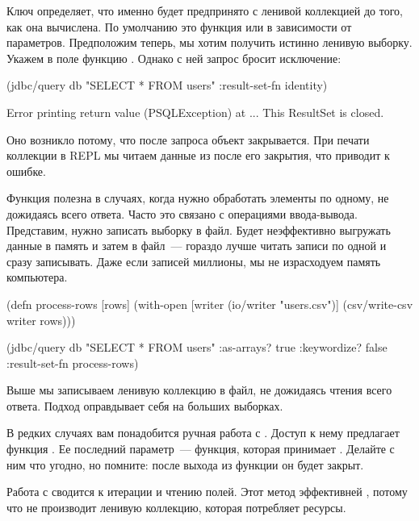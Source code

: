 Ключ  определяет, что именно будет предпринято с ленивой коллекцией до того, как она вычислена. По умолчанию это функция  или  в зависимости от параметров. Предположим теперь, мы хотим получить истинно ленивую выборку. Укажем в поле  функцию . Однако с ней запрос бросит исключение:

\begin{english}
  \begin{clojure}
(jdbc/query db "SELECT * FROM users"
               {:result-set-fn identity})

Error printing return value (PSQLException) at ...
This ResultSet is closed.
  \end{clojure}
\end{english}

Оно возникло потому, что после запроса объект  закрывается. При печати коллекции в REPL мы читаем данные из  после его закрытия, что приводит к ошибке.

Функция  полезна в случаях, когда нужно обработать элементы по одному, не дожидаясь всего ответа. Часто это связано с операциями ввода-вывода. Представим, нужно записать выборку в файл. Будет неэффективно выгружать данные в память и затем в файл~--- гораздо лучше читать записи по одной и сразу записывать. Даже если записей миллионы, мы не израсходуем память компьютера.

\begin{english}
  \begin{clojure}
(defn process-rows [rows]
  (with-open [writer (io/writer "users.csv")]
    (csv/write-csv writer rows)))

(jdbc/query db "SELECT * FROM users"
               {:as-arrays? true
               :keywordize? false
               :result-set-fn process-rows})
  \end{clojure}
\end{english}

Выше мы записываем ленивую коллекцию  в файл, не дожидаясь чтения всего ответа. Подход оправдывает себя на больших выборках.

В редких случаях вам понадобится ручная работа с . Доступ к нему предлагает функция . Ее последний параметр~--- функция, которая принимает . Делайте с ним что угодно, но помните: после выхода из функции он будет закрыт.

Работа с  сводится к итерации  и чтению полей. Этот метод эффективней , потому что не производит ленивую коллекцию, которая потребляет ресурсы.

